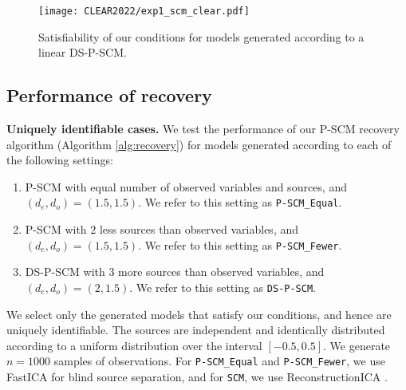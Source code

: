 \documentclass[12pt]{article}
\begin{document}
\begin{figure}[t]
  \centering
  \texttt{[image: CLEAR2022/exp1\_scm\_clear.pdf]}
  \caption{Satisfiability of our conditions for models generated according to a linear DS-P-SCM. 
  }
  \label{fig:satis2}
\end{figure}

\subsection{Performance of recovery}\label{app:simulation_recovery}

\textbf{Uniquely identifiable cases. }
We test the performance of our P-SCM recovery algorithm (Algorithm \ref{alg:recovery}) for models generated according to each of the following settings:
\begin{enumerate}[(1)]
\item P-SCM with equal number of observed variables and sources, and $(d_e, d_o)=(1.5, 1.5)$. We refer to this setting as \texttt{P-SCM\_Equal}. 
\item P-SCM with $2$ less sources than observed variables, and $(d_e, d_o)=(1.5, 1.5)$. We refer to this setting as \texttt{P-SCM\_Fewer}. 

\item DS-P-SCM with $3$ more sources than observed variables, and $(d_e, d_o)=(2, 1.5)$. We refer to this setting as \texttt{DS-P-SCM}. 
\end{enumerate}

We select only the generated models that satisfy our conditions, and hence are uniquely identifiable. The sources are independent and identically distributed according to a uniform distribution over the interval $[-0.5, 0.5]$. We generate $n=1000$ samples of observations. For \texttt{P-SCM\_Equal} and \texttt{P-SCM\_Fewer}, we use FastICA \citep{hyvarinen1999fast} for blind source separation, and for \texttt{SCM}, we use ReconstructionICA \citep{le2011ica}.
\end{document}
